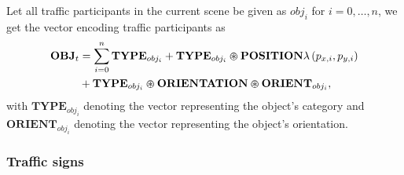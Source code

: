 Let all traffic participants in the current scene be given as $obj_{i}$ for $i=0, \ldots, n$, we get the vector encoding traffic participants as
\begin{align}
\label{eq:traffic_participants_context_class}
\mathbf{OBJ}_{t} &= \sum\limits_{i=0}^{n} \mathbf{TYPE}_{obj_i} + \mathbf{TYPE}_{obj_i} \varoast \mathbf{POSITION} \lambda\left(p_{x,i},p_{y,i}\right) \nonumber \\
                 &+ \mathbf{TYPE}_{obj_i}\varoast\mathbf{ORIENTATION}\varoast\mathbf{ORIENT}_{obj_i},
\end{align}
with $ \mathbf{TYPE}_{obj_i}$ denoting the vector representing the object's category and $ \mathbf{ORIENT}_{obj_i}$ denoting the vector representing the object's orientation.

\subsubsection{Traffic signs}%
\label{ssubsec:traffic_signs}

